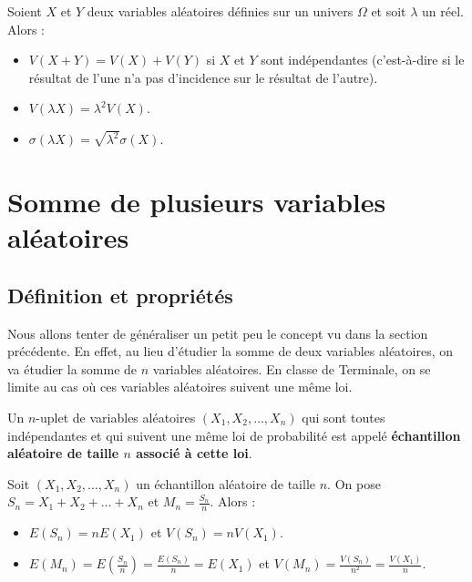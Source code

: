 	\begin{formula}
		Soient $X$ et $Y$ deux variables aléatoires définies sur un univers $\Omega$ et soit $\lambda$ un réel. Alors :
		\begin{itemize}
			\item $V(X + Y) = V(X) + V(Y)$ si $X$ et $Y$ sont indépendantes (c'est-à-dire si le résultat de l'une n'a pas d'incidence sur le résultat de l'autre).
			\item $V(\lambda X) = \lambda^2 V(X)$.
			\item $\sigma(\lambda X) = \sqrt{\lambda^2} \sigma(X)$.
		\end{itemize}
	\end{formula}

	\section{Somme de plusieurs variables aléatoires}

	\subsection{Définition et propriétés}

	Nous allons tenter de généraliser un petit peu le concept vu dans la section précédente. En effet, au lieu d'étudier la somme de deux variables aléatoires, on va étudier la somme de $n$ variables aléatoires.
	\newpar
	En classe de Terminale, on se limite au cas où ces variables aléatoires suivent une même loi.

	\begin{formula}
		Un $n$-uplet de variables aléatoires $(X_1, X_2, \dots, X_n)$ qui sont toutes indépendantes et qui suivent une même loi de probabilité est appelé \textbf{échantillon aléatoire de taille $n$ associé à cette loi}.
	\end{formula}

	\begin{formula}
		Soit $(X_1, X_2, \dots, X_n)$ un échantillon aléatoire de taille $n$. On pose $S_n = X_1 + X_2 + \dots + X_n$ et $M_n = \frac{S_n}{n}$. Alors :
		\begin{itemize}
			\item $E(S_n) = nE(X_1)$ et $V(S_n) = nV(X_1)$.
			\item $E(M_n) = E\left(\frac{S_n}{n}\right) = \frac{E(S_n)}{n} = E(X_1)$ et $V(M_n) = \frac{V(S_n)}{n^2} = \frac{V(X_1)}{n}$.
		\end{itemize}
	\end{formula}

